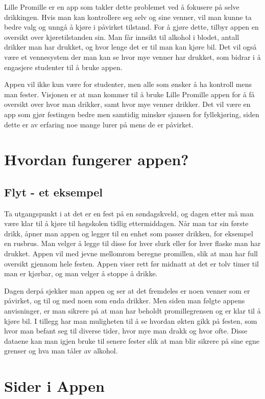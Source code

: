 \documentclass[12pt]{article}
\begin{document}
Lille Promille er en app som takler dette problemet ved å fokusere på selve drikkingen. Hvis man kan kontrollere seg selv og sine venner, vil man kunne ta bedre valg og unngå å kjøre i påvirket tilstand. For å gjøre dette, tilbyr appen en oversikt over kjøretilstanden sin. Man får innsikt til alkohol i blodet, antall drikker man har drukket, og hvor lenge det er til man kan kjøre bil. Det vil også være et vennesystem der man kan se hvor mye venner har drukket, som bidrar i å engasjere studenter til å bruke appen.

Appen vil ikke kun være for studenter, men alle som ønsker å ha kontroll mens man fester. Visjonen er at man kommer til å bruke Lille Promille appen for å få oversikt over hvor man drikker, samt hvor mye venner drikker. Det vil være en app som gjør festingen bedre men samtidig minsker sjansen for fyllekjøring, siden dette er av erfaring noe mange lurer på mens de er påvirket.

\section{Hvordan fungerer appen?}
\subsection{Flyt - et eksempel}
Ta utgangspunkt i at det er en fest på en søndagskveld, og dagen etter må man være klar til å kjøre til høgskolen tidlig ettermiddagen. Når man tar sin første drikk, åpner man appen og legger til en enhet som passer drikken, for eksempel en rusbrus. Man velger å legge til disse for hver slurk eller for hver flaske man har drukket. Appen vil med jevne mellomrom beregne promillen, slik at man har full oversikt gjennom hele festen. Appen viser rett før midnatt at det er tolv timer til man er kjørbar, og man velger å stoppe å drikke.

Dagen derpå sjekker man appen og ser at det fremdeles er noen venner som er påvirket, og til og med noen som enda drikker. Men siden man følgte appens anvisninger, er man sikrere på at man har beholdt promillegrensen og er klar til å kjøre bil. I tillegg har man muligheten til å se hvordan økten gikk på festen, som hvor man befant seg til diverse tider, hvor mye man drakk og hvor ofte. Disse dataene kan man igjen bruke til senere fester slik at man blir sikrere på sine egne grenser og hva man tåler av alkohol.


\section{Sider i Appen}
\end{document}
